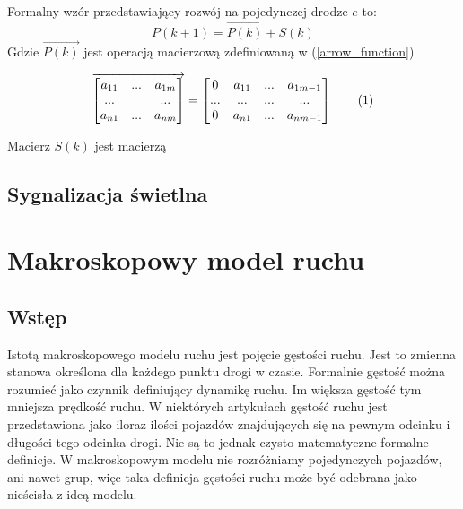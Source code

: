 \documentclass[12pt]{book}
\newcommand\addtag{\refstepcounter{equation}\tag{\theequation}}
\begin{document}
Formalny wzór przedstawiający rozwój na pojedynczej drodze $e$ to:
\[P(k+1)=\overrightarrow{P(k)} + S(k)\]
Gdzie $\overrightarrow{P(k)}$ jest operacją macierzową zdefiniowaną w (\ref{arrow_function})

\begin{gather}
\overrightarrow{
  \begin{bmatrix}
   a_{11} & ... & a_{1m}\\
   ... & & ...\\
   a_{n1} & ... & a_{nm}\\
   \end{bmatrix}}
 =
  \begin{bmatrix}
   0 & a_{11} & ... & a_{1m-1}\\
   ... & ... & ... & ...\\
   0 & a_{n1} & ... & a_{nm-1}\\
   \end{bmatrix}
   \addtag
   \label{arrow_function}
\end{gather}

Macierz $S(k)$ jest macierzą



\subsection{Sygnalizacja świetlna}



\section{Makroskopowy model ruchu} 
\subsection{Wstęp}
Istotą makroskopowego modelu ruchu jest pojęcie gęstości ruchu. Jest to zmienna stanowa określona dla każdego punktu drogi w czasie. Formalnie gęstość można rozumieć jako czynnik definiujący dynamikę ruchu. Im większa gęstość tym mniejsza prędkość ruchu. W niektórych artykułach gęstość ruchu \cite{helbing2001master} jest przedstawiona jako iloraz ilości pojazdów znajdujących się na pewnym odcinku i długości tego odcinka drogi. Nie są to jednak czysto matematyczne formalne definicje. W makroskopowym modelu nie rozróżniamy pojedynczych pojazdów, ani nawet grup, więc taka definicja gęstości ruchu może być odebrana jako nieścisła z ideą modelu. 
\end{document}
